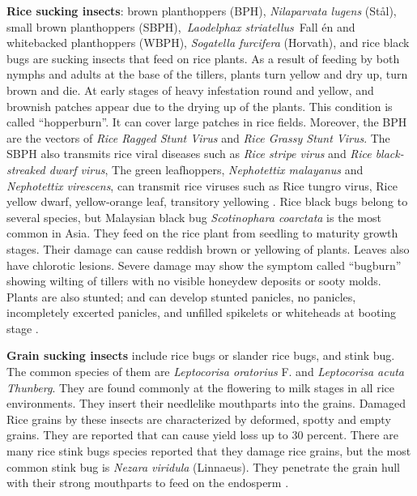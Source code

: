 \documentclass[12pt, oneside]{report}
\begin{document}
\textbf{Rice sucking insects}: brown planthoppers (BPH), \textit{Nilaparvata lugens} (St\aa l), small brown planthoppers (SBPH), \textit{Laodelphax striatellus} Fall \'en and whitebacked planthoppers (WBPH), \textit{Sogatella furcifera} (Horvath), and rice black bugs are sucking insects that feed on rice plants. As a result of feeding by both nymphs and adults at the base of the tillers, plants turn yellow and dry up, turn brown and die. At early stages of heavy infestation round and yellow, and brownish patches appear due to the drying up of the plants. This condition is called ``hopperburn''. It can cover large patches in rice fields. Moreover, the BPH are the vectors of \textit{Rice Ragged Stunt Virus} and \textit{Rice Grassy Stunt Virus}. The SBPH also transmits rice viral diseases such as \textit{Rice stripe virus} and \textit{Rice black-streaked dwarf virus}, The green leafhoppers, \textit{Nephotettix malayanus} and \textit{Nephotettix virescens}, can transmit rice viruses such as Rice tungro virus, Rice yellow dwarf, yellow-orange leaf, transitory yellowing \citep{ling1972rice}. Rice black bugs belong to several species, but Malaysian black bug \textit{Scotinophara coarctata} is the most common in Asia. They feed on the rice plant from seedling to maturity growth stages. Their damage can cause reddish brown or yellowing of plants. Leaves also have chlorotic lesions. Severe damage may show the symptom called ``bugburn'' showing wilting of tillers with no visible honeydew deposits or sooty molds. Plants are also stunted; and can develop stunted panicles, no panicles, incompletely excerted panicles, and unfilled spikelets or whiteheads at booting stage \citep{shepard1995rice}. 

\textbf{Grain sucking insects} include rice bugs or slander rice bugs, and stink bug. The common species of them are \textit{Leptocorisa oratorius} F. and \textit{Leptocorisa acuta Thunberg}. They are found commonly at the flowering to milk stages in all rice environments. They insert their needlelike mouthparts into the grains. Damaged Rice grains by these insects are characterized by deformed, spotty and empty grains. They are reported that can cause yield loss up to 30 percent. There are many rice stink bugs species reported that they damage rice grains, but the most common stink bug is \textit{Nezara viridula} (Linnaeus). They penetrate the grain hull with their strong mouthparts to feed on the endosperm \citep{shepard1995rice}. 
\end{document}
